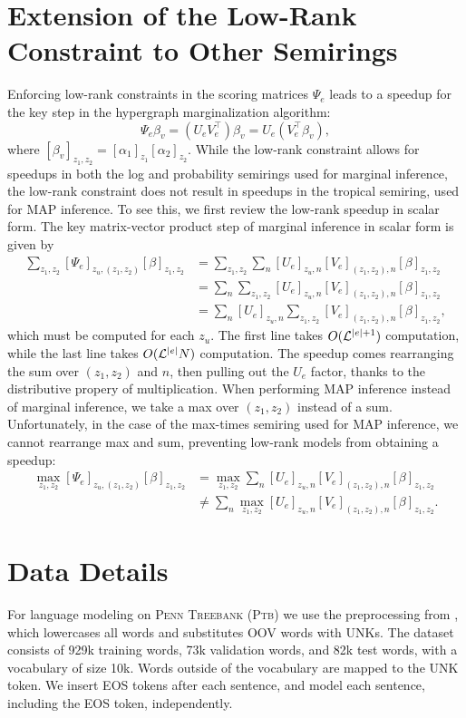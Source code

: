\documentclass{article}
\begin{document}
\section{Extension of the Low-Rank Constraint to Other Semirings}
Enforcing low-rank constraints in the scoring matrices $\Psi_e$
leads to a speedup for the key step in the hypergraph marginalization algorithm:
\begin{equation}
    \Psi_e\beta_v =  \left(U_e V_e^\top\right) \beta_v =  U_e\left(V_e^\top\beta_v\right),
\end{equation}
where $[\beta_v]_{z_1,z_2} = [\alpha_1]_{z_1}[\alpha_2]_{z_2}$.
While the low-rank constraint allows for speedups in both the log and probability semirings
used for marginal inference,
the low-rank constraint does not result in speedups in the tropical semiring,
used for MAP inference.
To see this, we first review the low-rank speedup in scalar form.
The key matrix-vector product step of marginal inference in scalar form is given by
\begin{align*}
\sum_{z_1,z_2} [\Psi_e]_{z_u,(z_1,z_2)}[\beta]_{z_1,z_2}
&= \sum_{z_1,z_2} \sum_n [U_e]_{z_u,n}[V_e]_{(z_1,z_2),n}[\beta]_{z_1,z_2}\\
&= \sum_n \sum_{z_1,z_2} [U_e]_{z_u,n}[V_e]_{(z_1,z_2),n}[\beta]_{z_1,z_2}\\
&= \sum_n [U_e]_{z_u,n}\sum_{z_1,z_2} [V_e]_{(z_1,z_2),n}[\beta]_{z_1,z_2},
\end{align*}
which must be computed for each $z_u$.
The first line takes $O(\mathcal{L}^{|e|+1})$ computation,
while the last line takes $O(\mathcal{L}^{|e|}N)$ computation.
The speedup comes rearranging the sum over $(z_1,z_2)$ and $n$,
then pulling out the $U_e$ factor, thanks to the distributive
propery of multiplication.
When performing MAP inference instead of marginal inference,
we take a max over $(z_1,z_2)$ instead of a sum.
Unfortunately, in the case of the max-times semiring used for MAP inference,
we cannot rearrange max and sum,
preventing low-rank models from obtaining a speedup:
\begin{align*}
\max_{z_1,z_2} [\Psi_e]_{z_u,(z_1,z_2)}[\beta]_{z_1,z_2}
&= \max_{z_1,z_2} \sum_n [U_e]_{z_u,n}[V_e]_{(z_1,z_2),n}[\beta]_{z_1,z_2}\\
&\ne \sum_n \max_{z_1,z_2} [U_e]_{z_u,n}[V_e]_{(z_1,z_2),n}[\beta]_{z_1,z_2}.
\end{align*}

\section{\label{sec:data}Data Details}
For language modeling on \textsc{Penn Treebank} (\textsc{Ptb}) \citep{ptb}
we use the preprocessing from \citet{mikolov-2011},
which lowercases all words and substitutes OOV words with UNKs. 
The dataset consists of 929k training words, 73k validation words, and 82k test words, with a vocabulary of size 10k.
Words outside of the vocabulary are mapped to the UNK token.
We insert EOS tokens after each sentence, and model each sentence, including the EOS token, independently.
\end{document}
